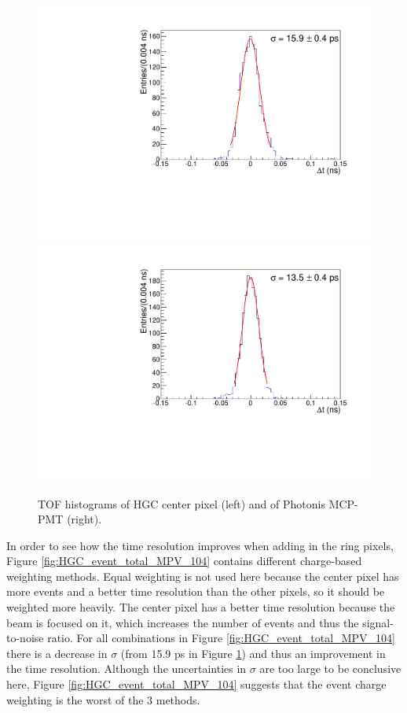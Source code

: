 \documentclass[twocolumn,aps,prd,reprint,superscriptaddress,floatfix]{revtex4-1}
\begin{document}
\begin{figure}%
\centering
	\includegraphics[width=.49\textwidth]{deltaTCenter104.pdf}
	\includegraphics[width=.49\textwidth]{deltaTMCP104.pdf}
	\caption{TOF histograms of HGC center pixel (left) and of Photonis MCP-PMT (right).}
	\label{fig:center_MCP_104}
\end{figure}

In order to see how the time resolution improves when adding in the ring pixels, Figure \ref{fig:HGC_event_total_MPV_104} contains different charge-based weighting methods. 
Equal weighting is not used here because the center pixel has more events and a better time resolution than the other pixels, so it should be weighted more heavily. 
The center pixel has a better time resolution because the beam is focused on it, which increases the number of events and thus the signal-to-noise ratio. 
For all combinations in Figure \ref{fig:HGC_event_total_MPV_104} there is a decrease in $\sigma$ (from 15.9 ps in Figure \ref{fig:center_MCP_104}) and thus an improvement in the time resolution. 
Although the uncertainties in $\sigma$ are too large to be conclusive here, Figure \ref{fig:HGC_event_total_MPV_104} suggests that the event charge weighting is the worst of the 3 methods.
\end{document}
